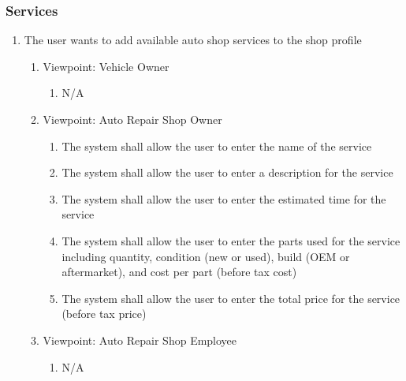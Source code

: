 \documentclass[12pt]{article}
\begin{document}
\subsubsection{Services}
\begin{enumerate}[resume*=business_events]
	\item The user wants to add available auto shop services to the shop profile
	      \begin{enumerate}[VP\arabic*.]
		      \item Viewpoint: Vehicle Owner
		            \begin{enumerate}
			            \item[] N/A
		            \end{enumerate}
		      \item Viewpoint: Auto Repair Shop Owner
		            \begin{enumerate}
			            \item The system shall allow the user to enter the name of the service
			            \item The system shall allow the user to enter a description for the service
			            \item The system shall allow the user to enter the estimated time for the service
			            \item The system shall allow the user to enter the parts used for the service including quantity,
			                  condition (new or used), build (OEM or aftermarket), and cost per part (before tax cost)
			            \item The system shall allow the user to enter the total price for the service (before tax price)
		            \end{enumerate}
		      \item Viewpoint: Auto Repair Shop Employee
		            \begin{enumerate}
			            \item[] N/A
		            \end{enumerate}
	      \end{enumerate}


\end{enumerate}
\end{document}
